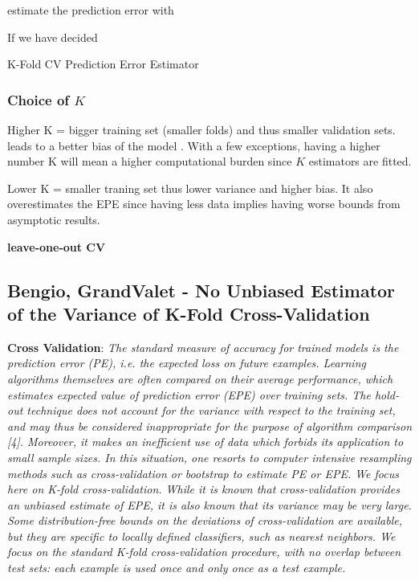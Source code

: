  
 estimate the prediction error with
 
 
 
 If we have decided 
 
 
 
 \begin{definition}{K-Fold CV Prediction Error Estimator}
 	
 \end{definition}
 
 \subsubsection{Choice of $K$} 
 
 Higher K = bigger training set (smaller folds) and thus smaller validation sets. leads to a better bias of the model . With a few exceptions, having a higher number K will mean a higher computational burden since $K$ estimators are fitted. 
 
 Lower K = smaller traning set thus lower variance and higher bias. It also overestimates the EPE since having less data implies having worse bounds from asymptotic results. 
 
 \textbf{leave-one-out CV}
 
 
 \subsection{Bengio, GrandValet - No Unbiased Estimator of the Variance of K-Fold Cross-Validation}
 \textbf{Cross Validation}: 
 \textit{The standard measure of accuracy for trained models is the prediction error (PE), i.e. the expected loss on future examples. Learning algorithms themselves are often compared on their average performance, which estimates expected value of prediction error (EPE) over training sets.
 	The hold-out technique does not account for the variance with respect to the training set, and may thus be considered inappropriate for the purpose of algorithm comparison [4]. Moreover, it makes an inefficient use of data which forbids its application to small sample sizes. In this situation, one resorts to computer intensive resampling methods such as cross-validation or bootstrap to estimate PE or EPE. We focus here on K-fold cross-validation. While it is known that cross-validation provides an unbiased estimate of EPE, it is also known that its variance may be very large.
 	Some distribution-free bounds on the deviations of cross-validation are available, but they are specific to locally defined classifiers, such as nearest neighbors.
 	We focus on the standard K-fold cross-validation procedure, with no overlap between test sets: each example is used once and only once as a test example.
 }
 
